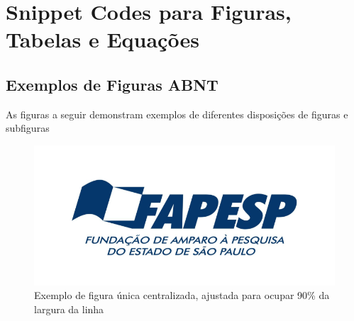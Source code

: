 \setcounter{chapter}{-1} 

\chapter{Snippet Codes para Figuras, Tabelas e Equações}

\section{Exemplos de Figuras ABNT}

As figuras a seguir demonstram exemplos de diferentes disposições de figuras e subfiguras

\begin{figure}[H]
	\centering
	\includegraphics[width=0.9\linewidth]{Figuras/FAPESP.png}
	\caption{Exemplo de figura única centralizada, ajustada para ocupar 90\% da largura da linha}
	\label{fig:unica}
\end{figure}

